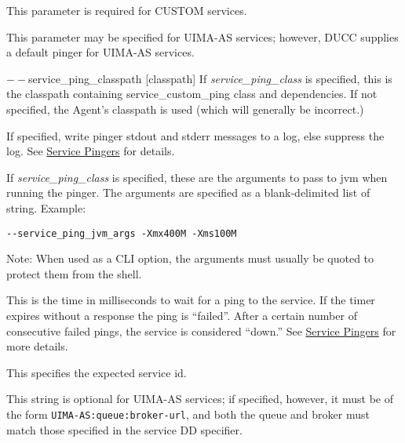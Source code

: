 \begin{description}
        This parameter is required for CUSTOM services.

        This parameter may be specified for UIMA-AS services; however, DUCC supplies a default
        pinger for UIMA-AS services.

        \begin{sloppypar}
        \item[$--$service\_ping\_classpath {[classpath]}] If {\em service\_ping\_class} is specified,
          this is the classpath containing service\_custom\_ping class and dependencies.  If not
          specified, the Agent's classpath is used (which will generally be incorrect.)
        \end{sloppypar}
        
      \item[$--$service\_ping\_dolog {[boolean]}] If specified, write pinger stdout and stderr
        messages to a log, else suppress the log. See \hyperref[sec:service.pingers]{Service Pingers}
        for details.

      \item[$--$service\_ping\_jvm\_args {[java-system-property-assignments]}] If 
        {\em service\_ping\_class} is specified, these are the arguments 
        to pass to jvm when running the pinger. The arguments are specified as a blank-delimited
        list of string.  Example:
\begin{verbatim}
--service_ping_jvm_args -Xmx400M -Xms100M
\end{verbatim}
        
        Note: When used as a CLI option, the arguments must usually be
        quoted to protect them from the shell.

      \item[$--$service\_ping\_timeout {[time-in-ms]}] This is the time in milliseconds to wait for a
        ping to the service.  If the timer expires without a response the ping is ``failed''. After
        a certain number of consecutive failed pings, the service is considered ``down.''  See
        \hyperref[sec:service.pingers]{Service Pingers} for more details.

      \item[$--$service\_request\_endpoint {[string]}] This specifies the expected service id.  
        \begin{sloppypar}
          This string is optional for UIMA-AS services; if specified, however, it must be of the
          form {\tt UIMA-AS:queue:broker-url}, and both the queue and broker must match those specified in the
          service DD specifier.
        \end{sloppypar}
        

\end{description}
